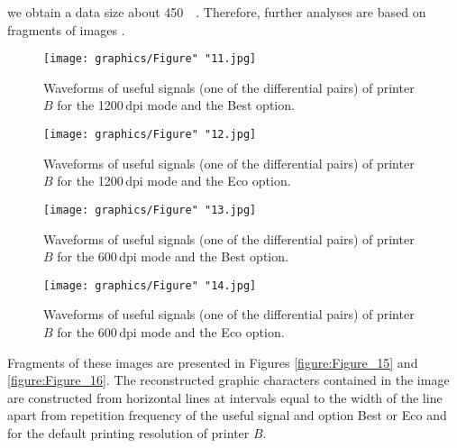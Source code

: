 \documentclass[12pt,a4paper]{article}
\newlength{\oscope}
\begin{document}
\noindent we obtain a data size about \SI{450}{\mega\byte}. Therefore,
further analyses are based on fragments of images
\cite{Grzesiak2010a,Kubiak2015b}.

\begin{figure}[ht]
    \centering
    \texttt{[image: graphics/Figure" "11.jpg]}
    \caption{Waveforms of useful signals (one of the differential pairs) of
        printer $B$ for the 1200\,dpi mode and the Best option.}
    \label{figure:Figure_11}
\end{figure}

\begin{figure}[ht]
    \centering
    \texttt{[image: graphics/Figure" "12.jpg]}
    \caption{Waveforms of useful signals (one of the differential pairs) of
        printer $B$ for the 1200\,dpi mode and the Eco option.}
    \label{figure:Figure_12}
\end{figure}

\begin{figure}[ht]
    \centering
    \texttt{[image: graphics/Figure" "13.jpg]}
    \caption{Waveforms of useful signals (one of the differential pairs) of
        printer $B$ for the 600\,dpi mode and the Best option.}
    \label{figure:Figure_13}
\end{figure}

\begin{figure}[ht]
    \centering
    \texttt{[image: graphics/Figure" "14.jpg]}
    \caption{Waveforms of useful signals (one of the differential pairs) of
        printer $B$ for the 600\,dpi mode and the Eco option.}
    \label{figure:Figure_14}
\end{figure}

Fragments of these images are presented in Figures \ref{figure:Figure_15} and
\ref{figure:Figure_16}. The reconstructed graphic characters contained in the
image are constructed from horizontal lines at intervals equal to the width
of the line \cite{Kubiak2006a} apart from repetition frequency of the useful
signal and option Best or Eco and for the default printing resolution of
printer $B$.
\end{document}
